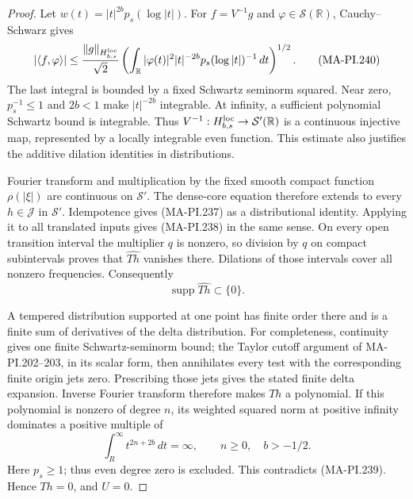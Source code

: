 \begin{proof}
Let $w(t)=|t|^{2b}p_s(\log|t|)$. For $f=V^{-1}g$ and
$\varphi\in\mathcal S(\mathbb R)$, Cauchy--Schwarz gives
\[
 |\langle f,\varphi\rangle|
 \le\frac{\|g\|_{H_{b,s}^{\rm loc}}}{\sqrt2}
     \left(\int_{\mathbb R}
          |\varphi(t)|^2|t|^{-2b}
                         p_s(\log|t|)^{-1}\,dt\right)^{1/2}.
 \tag{MA-PI.240}
\]
The last integral is bounded by a fixed Schwartz
seminorm squared. Near zero, $p_s^{-1}\le1$ and
$2b<1$ make $|t|^{-2b}$ integrable. At infinity, a
sufficient polynomial Schwartz bound is integrable.
Thus $V^{-1}:H_{b,s}^{\rm loc}\to\mathcal S'(\mathbb R)$
is a continuous injective map, represented by a locally
integrable even function. This estimate also justifies
the additive dilation identities in distributions.

Fourier transform and multiplication by the fixed smooth
compact function $\rho(|\xi|)$ are continuous on
$\mathcal S'$. The dense-core equation therefore extends
to every $h\in\mathscr J$ in $\mathcal S'$. Idempotence
gives (MA-PI.237) as a distributional identity. Applying
it to all translated inputs gives (MA-PI.238) in the
same sense. On every open transition interval the
multiplier $q$ is nonzero, so division by $q$ on compact
subintervals proves that $\widehat{Th}$ vanishes there.
Dilations of those intervals cover all nonzero
frequencies. Consequently
\[
                 \operatorname{supp}\widehat{Th}\subset\{0\}.
 \tag{MA-PI.241}
\]

A tempered distribution supported at one point has
finite order there and is a finite sum of derivatives
of the delta distribution. For completeness, continuity
gives one finite Schwartz-seminorm bound; the Taylor
cutoff argument of MA-PI.202--203, in its scalar form,
then annihilates every test with the corresponding
finite origin jets zero. Prescribing those jets gives
the stated finite delta expansion. Inverse Fourier
transform therefore makes $Th$ a polynomial.
If this polynomial is nonzero of degree $n$, its
weighted squared norm at positive infinity dominates
a positive multiple of
\[
             \int_R^\infty t^{2n+2b}\,dt=\infty,
                    \qquad n\ge0,\quad b>-1/2.
 \tag{MA-PI.242}
\]
Here $p_s\ge1$; thus even degree zero is excluded.
This contradicts (MA-PI.239). Hence $Th=0$, and $U=0$.
\end{proof}

